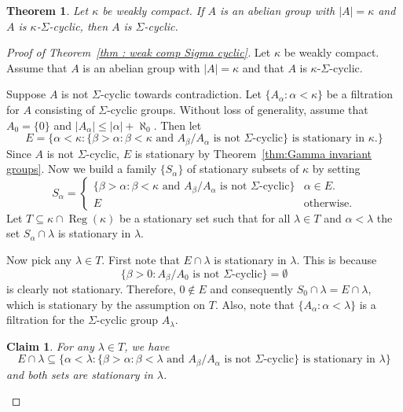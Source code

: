 \documentclass[a4paper]{amsart}
\newtheorem{theorem}{Theorem}[section]
\newtheorem{claim}{Claim}[theorem]
\theoremstyle{definition}
\theoremstyle{remark}
\numberwithin{equation}{section}
\DeclareMathOperator{\Reg}{Reg}
\begin{document}
\begin{theorem}
        \label{thm:compactness sigma cyclic}
        Let \(\kappa\) be weakly compact. If \(A\) is an abelian group with \(|A| = \kappa\) and \(A\) is \(\kappa\)-\(\Sigma\)-cyclic, then \(A\) is \(\Sigma\)-cyclic.
    \end{theorem}

    \begin{proof}[Proof of Theorem~\ref{thm : weak comp Sigma cyclic}]
    Let \(\kappa\) be weakly compact. Assume that \(A\) is an abelian group with \(|A| = \kappa\) and that \(A\) is \(\kappa\)-\(\Sigma\)-cyclic.

    
    Suppose \(A\) is not \(\Sigma\)-cyclic towards contradiction.
        Let \(\{A_\alpha: \alpha<\kappa\}\) be a filtration for \(A\) consisting of \(\Sigma\)-cyclic groups.
        Without loss of generality, assume that \(A_0 = \{0\}\) and \(|A_\alpha|\leq{|\alpha|+\aleph_0}\). Then let
        \[
        E = \{\alpha<\kappa :
        \{ \beta>\alpha : \beta<\kappa \text{ and } A_\beta/A_\alpha\text{ is not \(\Sigma\)-cyclic}\}
        \text{ is stationary in \(\kappa\)}.
        \}
        \]
        Since \(A\) is not \(\Sigma\)-cyclic, \(E\) is stationary by Theorem~\ref{thm:Gamma invariant groups}. Now we build a family \(\{S_\alpha\}\) of stationary subsets of \(\kappa\)  by setting
        \[
        S_\alpha =
        \begin{cases}
            \{\beta>\alpha : \beta<\kappa \text{ and } A_\beta/A_\alpha \text{ is not \(\Sigma\)-cyclic}\} &\alpha \in E.\\
            E &\text{otherwise}.
        \end{cases}
        \]
        Let \(T\subseteq \kappa \cap \Reg(\kappa)\) be a stationary set such that for all \(\lambda\in T\) and \(\alpha<\lambda\) the set \(S_\alpha\cap \lambda\) is stationary in \(\lambda\).

        Now pick any \(\lambda \in T\). First note that \(E\cap \lambda\) is stationary in \(\lambda\). This is because 
        \[\{\beta>0 : A_\beta / A_0\text{ is not \(\Sigma\)-cyclic}\} = \emptyset\] is clearly not stationary. Therefore, \(0 \notin E\) and consequently
        \(S_0\cap \lambda = E\cap \lambda\), which is stationary by the assumption on \(T\). Also, note that \(\{A_\alpha: \alpha<\lambda\}\) is a filtration for the \(\Sigma\)-cyclic group \(A_\lambda\).

        \begin{claim}For any \(\lambda \in T\), we have
            \[E\cap \lambda \subseteq \{ \alpha<\lambda : \{ \beta>\alpha: \beta<\lambda \text{ and \(A_\beta/A_\alpha\) is not \(\Sigma\)-cyclic}\} \text{ is stationary in } \lambda \}\] and both sets are stationary in $\lambda$.
        \end{claim}


\end{proof}
\end{document}
